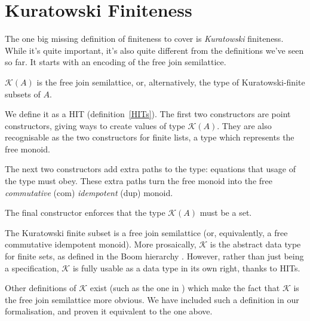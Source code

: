 \section{Kuratowski Finiteness} \label{kuratowski} 
The one big missing definition of finiteness to cover is \emph{Kuratowski}
finiteness.
While it's quite important, it's also quite different from the definitions we've
seen so far.
It starts with an encoding of the free join semilattice.
\begin{definition}
  \(\mathcal{K}(A)\) is the free join semilattice, or, alternatively, the type
  of Kuratowski-finite subsets of \(A\).
  \begin{agdalisting}
  \end{agdalisting}

  We define it as a HIT (definition~\ref{HITs}).
  The first two constructors are point constructors, giving ways to create
  values of type \(\mathcal{K}(A)\).
  They are also recognisable as the two constructors for finite lists, a type
  which represents the free monoid.

  The next two constructors add extra paths to the type: equations that usage of
  the type must obey.
  These extra paths turn the free monoid into the free \emph{commutative} (com)
  \emph{idempotent} (dup) monoid.

  The final constructor enforces that the type \(\mathcal{K}(A)\) must be a set.
\end{definition}
The Kuratowski finite subset is a free join semilattice (or, equivalently, a
free commutative idempotent monoid).
More prosaically, \(\mathcal{K}\) is the abstract data type for finite sets, as
defined in the Boom hierarchy \cite{boomFurtherThoughtsAbstracto1981,
  bunkenburgBoomHierarchy1994}.
However, rather than just being a specification, \(\mathcal{K}\) is fully usable
as a data type in its own right, thanks to HITs.

Other definitions of \(\mathcal{K}\) exist (such as the one in
\cite{fruminFiniteSetsHomotopy2018}) which make the fact that \(\mathcal{K}\) is
the free join semilattice more obvious.
We have included such a definition in our formalisation, and proven it
equivalent to the one above.

